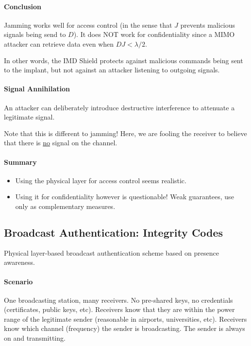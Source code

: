 \paragraph{Conclusion}
Jamming works well for access control (in the sense that $J$ prevents malicious signals being send to $D$).
It does NOT work for confidentiality since a MIMO attacker can retrieve data even when $DJ < \lambda/2$.

In other words, the IMD Shield protects against malicious commands being sent to the implant, but not against an attacker listening to outgoing signals.

\paragraph{Signal Annihilation}
An attacker can deliberately introduce destructive interference to attenuate a legitimate signal.

Note that this is different to jamming!
Here, we are fooling the receiver to believe that there is \underline{no} signal on the channel.

\paragraph{Summary}
\begin{itemize}
	\item Using the physical layer for access control seems realistic.
	\item Using it for confidentiality however is questionable!
	Weak guarantees, use only as complementary measures.
\end{itemize}


\subsection{Broadcast Authentication: Integrity Codes}

Physical layer-based broadcast authentication scheme based on presence awareness.

\paragraph{Scenario}
One broadcasting station, many receivers.
No pre-shared keys, no credentials (certificates, public keys, etc).
Receivers know that they are within the power range of the legitimate sender 
(reasonable in airports, universities, etc).
Receivers know which channel (frequency) the sender is broadcasting.
The sender is always on and transmitting.

